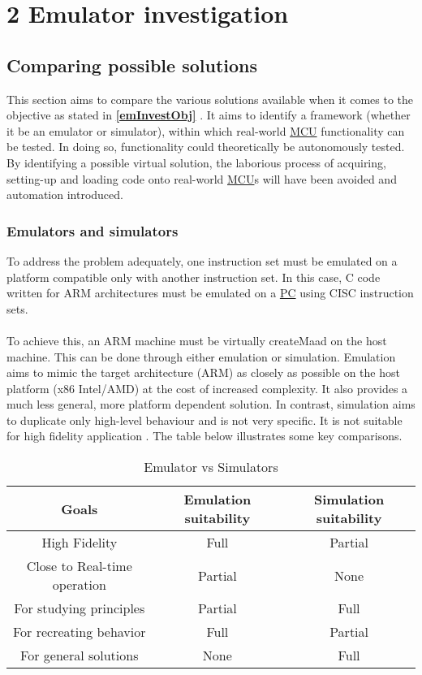 

\chapter*{2 Emulator investigation}
\setcounter{chapter}{2}
\setcounter{section}{0}
\setcounter{figure}{0}
\setcounter{table}{0}
\label{2emul}


\section{Comparing possible solutions}
\label{CompSolu}
This section aims to compare the various solutions available when it comes to the objective as stated in \textbf{\ref{emInvestObj} }. It aims to identify a framework (whether it be an emulator or simulator), within which real-world \hyperref[listAbr]{MCU} functionality can be tested. In doing so, functionality could theoretically be autonomously tested. By identifying a possible virtual solution, the laborious process of acquiring, setting-up and loading code onto real-world \hyperref[listAbr]{MCU}s will have been avoided and automation introduced.   
\subsection{Emulators and simulators}
\label{emuVsSim}
To address the problem adequately, one instruction set must be emulated on a platform compatible only with another instruction set. In this case, C code written for ARM architectures must be emulated on a \hyperref[listAbr]{PC} using CISC instruction sets.
\\\\
To achieve this, an ARM machine must be virtually createMaad on the host machine. This can be done through either emulation or simulation. Emulation aims to mimic the target architecture (ARM) as closely as possible on the host platform (x86 Intel/AMD) at the cost of increased complexity. It also provides a much less general, more platform dependent solution. In contrast, simulation aims to duplicate only high-level behaviour and is not very specific. It is not suitable for high fidelity application \cite{Chris}. The table below illustrates some key comparisons.

\begin{table}[H]
\begin{tabular}{ |c|c|c| } 
 \hline
 Goals & Emulation suitability & Simulation suitability \\ 
 \hline
 High Fidelity & Full & Partial \\ 
 Close to Real-time operation& Partial & None \\ 
 For studying principles & Partial & Full\\ 
 For recreating behavior & Full & Partial\\ 
 For general solutions & None & Full\\ 
 \hline
\end{tabular}
\caption{Emulator vs Simulators}
\label{emVsim}
\end{table}


